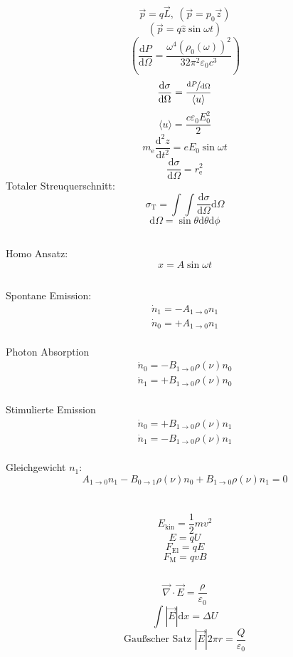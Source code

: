 \documentclass[12pt]{report}
\newcommand{\vabla}{\vec{\nabla}}
\newcommand{\vepsilon}{\varepsilon}
\newcommand{\dd}{\mathrm{d}}
\begin{document}
\[\vec{p}=q\vec{L},\ (\vec{p}=p_0\vec{z})\]
\[(\vec{p}=q\hat{z}\sin\omega t)\]
\[\left(\frac{\dd P}{\dd\Omega}=\frac{\omega^4(\rho_0(\omega))^2}{32\pi^2\vepsilon_0c^3}\right)\]
\[\frac{\dd\sigma}{\dd\Omega}=\frac{\nicefrac{\dd P}{\dd\Omega}}{\langle u\rangle}\]
\[\langle u\rangle=\frac{c\vepsilon_0E_0^2}{2}\]
\[m_\mathrm{e}\frac{\dd^2z}{\dd t^2}=eE_0\sin\omega t\]
\[\frac{\dd\sigma}{\dd\Omega}=r_\mathrm{e}^2\]
Totaler Streuquerschnitt:
\[\sigma_\mathrm{T}=\int\int\frac{\dd\sigma}{\dd\Omega}\dd\Omega\]
\[\dd\Omega=\sin\theta\dd\theta\dd\phi\]

\subsection{}
Homo Ansatz: \[x=A\sin\omega t\]

\subsection{}
Spontane Emission: \begin{align*}\dot{n}_1=-A_{1\to0}n_1\\\dot{n}_0=+A_{1\to0}n_1\end{align*}\\
Photon Absorption\begin{align*}\dot{n}_0=-B_{1\to0}\rho(\nu)n_0\\\dot{n}_1=+B_{1\to0}\rho(\nu)n_0\end{align*}\\
Stimulierte Emission\begin{align*}\dot{n}_0=+B_{1\to0}\rho(\nu)n_1\\\dot{n}_1=-B_{1\to0}\rho(\nu)n_1\end{align*}\\
Gleichgewicht $n_1$:
\[A_{1\to0}n_1-B_{0\to1}\rho(\nu)n_0+B_{1\to0}\rho(\nu)n_1=0\]

\section{}

\subsection{}
\[E_\mathrm{kin}=\frac{1}{2}mv^2\]
\[E=qU\]
\[F_\mathrm{El}=qE\]
\[F_\mathrm{M}=qvB\]

\subsection{}
\[\vabla\cdot\vec{E}=\frac{\rho}{\vepsilon_0}\]
\[\int|\vec{E}|\dd x=\Delta U\]
\[\textrm{Gau\ss scher Satz }|\vec{E}|2\pi r=\frac{Q}{\vepsilon_0}\]
\end{document}
